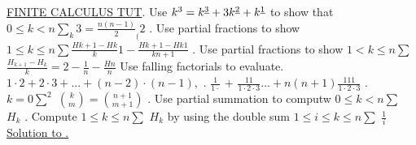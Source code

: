 \documentclass[12pt]{article}
\begin{document}
	\begin{center}
		\underline{FINITE \quad CALCULUS \quad TUT}. \quad Use \quad  \( k^{3}=k^{\uline{3}}+3k^{\uline{2}}+k^{\uline{1}} \)  \quad to \quad show \quad that\newline
		 \( 0 \leq k < n\sum_{k}3= \frac{n(n-1)}{2} _{(}2 \) \newline
		\noindent\makebox[\linewidth]{\rule{\textwidth}{1pt}}. \quad Use \quad partial \quad fractions \quad to \quad show\newline
		 \( 1 \leq k \leq n\sum \frac{Hk+1-Hk}{k} 1- \frac{Hk+1-Hk1}{kn+1}  \) . \quad Use \quad partial \quad fractions \quad to \quad show\newline
		 \( 1 < k \leq n\sum \)  \quad  \( \frac{H_{k+1} - H_{k}}{k}=2-\frac{1}{n}- \frac{Hn}{n}  \) \newline
		Use \quad falling \quad factorials \quad to \quad evaluate. \quad  \( 1\cdot2+2\cdot3+...+(n-2)\cdot(n-1), \) . \quad  \(  \frac{1}{1\cdot}  \)  \quad + \quad  \quad  \(  \frac{11}{1\cdot2\cdot3} ...+n(n+1) \frac{111}{1\cdot2\cdot3}  \) . \quad  \( k=0\sum^{2} \)  \quad  \( {{k}\choose{m}}={{n+1}\choose{m+1}} \) . \quad Use \quad partial \quad summation \quad to \quad computw \quad  \( 0 \leq k < n\sum \)  \quad  \( H_{k} \) . \quad Compute \quad  \( 1 \leq k \leq n\sum \)  \quad  \( H_{k} \)  \quad by \quad using \quad the \quad double \quad sum \quad  \( 1 \leq i \leq k \leq n\sum \)  \quad  \( \frac{1}{i} \) \newline
		\noindent\makebox[\linewidth]{\rule{\textwidth}{1pt}}\newline
		\underline{Solution \quad to .}\newline
	\end{center}
\end{document}
